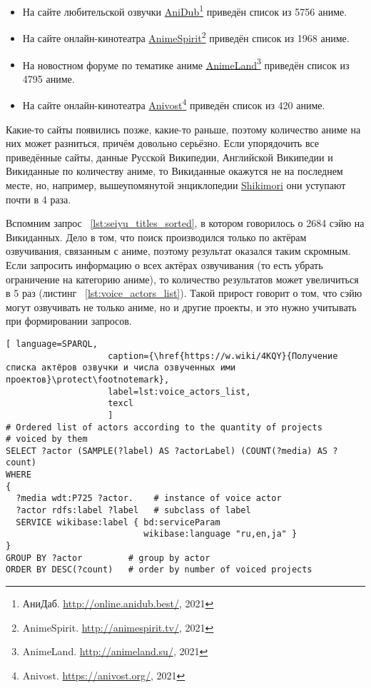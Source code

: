\begin{itemize}
	\item На сайте любительской озвучки \href{http://online.anidub.best/}{AniDub}\footnote{АниДаб. \href{http://online.anidub.best/}{http://online.anidub.best/}, 2021} приведён список из \num{5756} аниме.
	\item На сайте онлайн-кинотеатра \href{http://animespirit.tv/}{AnimeSpirit}\footnote{AnimeSpirit. \href{http://animespirit.tv/}{http://animespirit.tv/}, 2021} приведён список из \num{1968} аниме.
	\item На новостном форуме по тематике аниме \href{http://animeland.su/}{AnimeLand}\footnote{AnimeLand. \href{http://animeland.su/}{http://animeland.su/}, 2021} приведён список из \num{4795} аниме.
	\item На сайте онлайн-кинотеатра \href{https://anivost.org/}{Anivost}\footnote{Anivost. \href{https://anivost.org/}{https://anivost.org/}, 2021} приведён список из \num{420} аниме.
\end{itemize}

Какие-то сайты появились позже, какие-то раньше, поэтому количество аниме на них может разниться, причём довольно серьёзно. Если упорядочить все приведённые сайты, данные Русской Википедии, Английской Википедии и Викиданные по количеству аниме, то Викиданные окажутся не на последнем месте, но, например, вышеупомянутой энциклопедии \href{https://shikimori.one/}{Shikimori} они уступают почти в 4 раза.

Вспомним запрос ~\protect\ref{lst:seiyu_titles_sorted}, в котором говорилось о \num{2684} сэйю на Викиданных. Дело в том, что поиск производился только по актёрам озвучивания, связанным с аниме, поэтому результат оказался таким скромным. Если запросить информацию о всех актёрах озвучивания (то есть убрать ограничение на категорию аниме), то количество результатов может увеличиться в \num{5} раз (листинг ~\protect\ref{lst:voice_actors_list}). Такой прирост говорит о том, что сэйю могут озвучивать не только аниме, но и другие проекты, и это нужно учитывать при формировании запросов.

\begin{lstlisting}[ language=SPARQL, 
                    caption={\href{https://w.wiki/4KQY}{Получение списка актёров озвучки и числа озвученных ими проектов}\protect\footnotemark},
                    label=lst:voice_actors_list,
                    texcl 
                    ]
# Ordered list of actors according to the quantity of projects
# voiced by them
SELECT ?actor (SAMPLE(?label) AS ?actorLabel) (COUNT(?media) AS ?count)
WHERE
{
  ?media wdt:P725 ?actor.	 # instance of voice actor
  ?actor rdfs:label ?label	 # subclass of label
  SERVICE wikibase:label { bd:serviceParam
                           wikibase:language "ru,en,ja" }
}
GROUP BY ?actor		    # group by actor
ORDER BY DESC(?count)	# order by number of voiced projects 
\end{lstlisting}%

